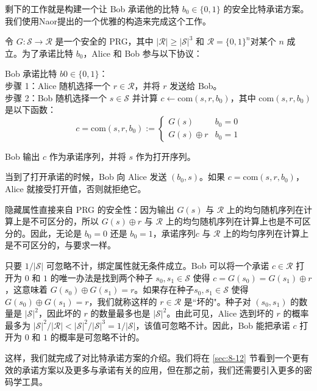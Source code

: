 \begin{snote}[来自安全PRG的比特承诺。]
剩下的工作就是构建一个让 Bob 承诺他的比特 $b_0\in\{0,1\}$ 的安全比特承诺方案。我们使用Naor提出的一个优雅的构造来完成这个工作。

令 $G:\mathcal{S}\to\mathcal{R}$ 是一个安全的 PRG，其中 $|\mathcal{R}|\geq|\mathcal{S}|^3$ 和 $\mathcal{R}=\{0,1\}^n$对某个 $n$ 成立。为了承诺比特 $b_0$，Alice 和 Bob 参与以下协议：

\vspace*{5pt}

\hspace*{5pt} Bob 承诺比特 $b0\in\{0,1\}$：\\
\hspace*{50pt} 步骤 1：Alice 随机选择一个 $r\in\mathcal{R}$，并将 $r$ 发送给 Bob。\\
\hspace*{50pt} 步骤 2：Bob 随机选择一个 $s\in\mathcal{S}$ 并计算 $c\leftarrow\mathrm{com}(s,r,b_0)$，其中 $\mathrm{com}(s,r,b_0)$ 是以下函数：\\
\[
c=\mathrm{com}(s,r,b_0):=
\left\{
\begin{array}{ll}
G(s) & b_0=0\\
G(s)\oplus r & b_0=1
\end{array}	
\right.
\]

\hspace*{5pt} Bob 输出 $c$ 作为承诺序列，并将 $s$ 作为打开序列。

\vspace*{5pt}

\noindent
当到了打开承诺的时候，Bob 向 Alice 发送 $(b_0,s)$。如果 $c=\mathrm{com}(s,r,b_0)$，Alice 就接受打开值，否则就拒绝它。

隐藏属性直接来自 PRG 的安全性：因为输出 $G(s)$ 与 $\mathcal{R}$ 上的均匀随机序列在计算上是不可区分的，所以 $G(s)\oplus r$ 与 $\mathcal{R}$ 上的均匀随机序列在计算上也是不可区分的。因此，无论是 $b_0=0$ 还是 $b_0=1$，承诺序列$c$ 与 $\mathcal{R}$ 上的均匀序列在计算上是不可区分的，与要求一样。

只要 $1/|\mathcal{S}|$ 可忽略不计，绑定属性就无条件成立。Bob 可以将一个承诺 $c\in\mathcal{R}$ 打开为 $0$ 和 $1$ 的唯一办法是找到两个种子 $s_0,s_1\in\mathcal{S}$ 使得 $c=G(s_0)=G(s_1)\oplus r$，这意味着 $G(s_0)\oplus G(s_1)=r$。如果存在种子$s_0,s_1\in\mathcal{S}$ 使得 $G(s_0)\oplus G(s_1)=r$，我们就称这样的 $r\in\mathcal{R}$ 是``坏的"。种子对 $(s_0,s_1)$ 的数量是 $|\mathcal{S}|^2$，因此坏的 $r$ 的数量最多也是 $|\mathcal{S}|^2$。由此可见，Alice 选到坏的 $r$ 的概率最多为 $|\mathcal{S}|^2/|\mathcal{R}| < |\mathcal{S}|^2/|\mathcal{S}|^3 = 1/|\mathcal{S}|$，该值可忽略不计。因此，Bob 能把承诺 $c$ 打开为 $0$ 和 $1$ 的概率是可忽略不计的。
\end{snote}

这样，我们就完成了对比特承诺方案的介绍。我们将在 \ref{sec:8-12} 节看到一个更有效的承诺方案以及更多与承诺有关的应用，但在那之前，我们还需要引入更多的密码学工具。